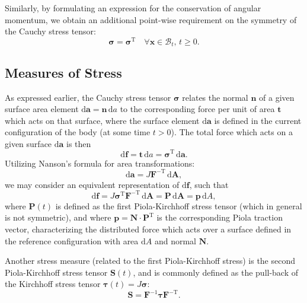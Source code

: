 Similarly, by formulating an expression for the conservation of angular momentum, we obtain an additional point-wise requirement on the symmetry of the Cauchy stress tensor:
\begin{equation}
  \boldsymbol{\sigma} = \boldsymbol{\sigma}^{\mathrm T} \quad \forall \bm{x} \in \mathcal{B}_t, \, t \geq 0.
\end{equation}

\subsection*{Measures of Stress}

As expressed earlier, the Cauchy stress tensor $\boldsymbol{\sigma}$ relates the normal $\bm{n}$ of a given surface area element $\mathrm d \bm{a} = \bm{n} \, \mathrm da$ to the corresponding force per unit of area $\bm{t}$ which acts on that surface, where the surface element $\mathrm d \bm{a}$ is defined in the current configuration of the body (at some time $t > 0$). The total force which acts on a given surface $\mathrm d \bm{a}$ is then
\begin{equation}
  \mathrm d \bm{f} = \bm{t} \, \mathrm da = \boldsymbol{\sigma}^{\mathrm T} \, \mathrm d \bm{a}.
\end{equation}
Utilizing Nanson's formula for area transformations:
\begin{equation}
  \mathrm d \bm{a} = J \bm{F}^{-\mathrm T} \, \mathrm d \bm{A},
\end{equation}
we may consider an equivalent representation of $\mathrm d \bm{f}$, such that
\begin{equation}
  \mathrm d \bm{f} = J \boldsymbol{\sigma}^{\mathrm T} \bm{F}^{-\mathrm T} \, \mathrm d \bm{A} = \bm{P} \, \mathrm d \bm{A} = \bm{p} \, \mathrm dA,
\end{equation}
where $\bm{P}(t)$ is defined as the first Piola-Kirchhoff stress tensor (which in general is not symmetric), and where $\bm{p} = \bm{N} \cdot \bm{P}^{\mathrm T}$ is the corresponding Piola traction vector, characterizing the distributed force which acts over a surface defined in the reference configuration with area $\mathrm dA$ and normal $\bm{N}$.

Another stress measure (related to the first Piola-Kirchhoff stress) is the second Piola-Kirchhoff stress tensor $\bm{S}(t)$, and is commonly defined as the pull-back of the Kirchhoff stress tensor $\boldsymbol{\tau}(t) = J \boldsymbol{\sigma}$:
\begin{equation}
  \bm{S} = \bm{F}^{-1} \boldsymbol{\tau} \bm{F}^{-\mathrm T}.
\end{equation}

